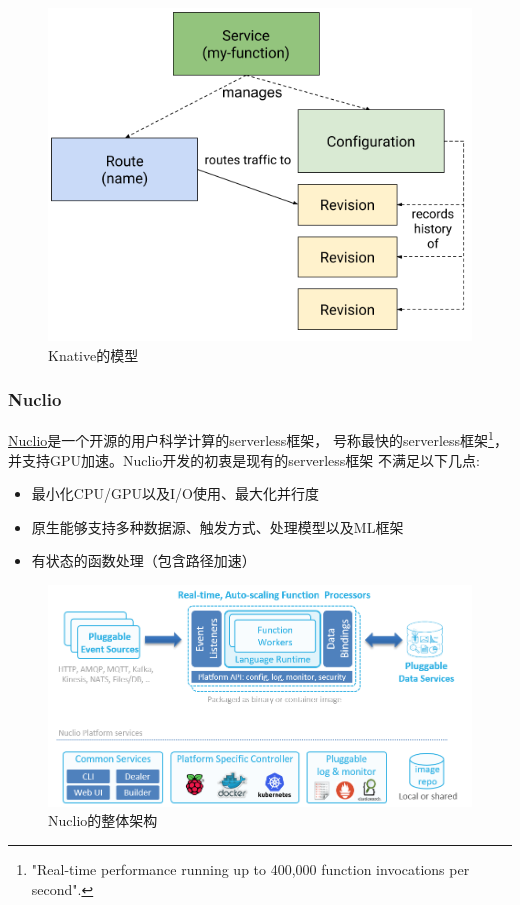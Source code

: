 \begin{figure}[ht!]
    \centering
    \includegraphics[width=\linewidth]{images/knative_object_model.png}
    \caption{Knative的模型}
    \label{knative_model}
\end{figure}

\subsubsection{Nuclio}
\href{https://nuclio.io/}{Nuclio}是一个开源的用户科学计算的serverless框架，
号称最快的serverless框架\footnote{"Real-time performance running up to 400,000 function invocations per second".}，
并支持GPU加速。Nuclio开发的初衷是现有的serverless框架
不满足以下几点\cite{why_nuclio}:

\begin{itemize}
    \item 最小化CPU/GPU以及I/O使用、最大化并行度
    \item 原生能够支持多种数据源、触发方式、处理模型以及ML框架
    \item 有状态的函数处理（包含路径加速）
\end{itemize}

\begin{figure}[ht!]
    \centering
    \includegraphics[width=\linewidth]{images/nuclio-arch.png}
    \caption{Nuclio的整体架构}
    \label{nuclio_model}
\end{figure}
